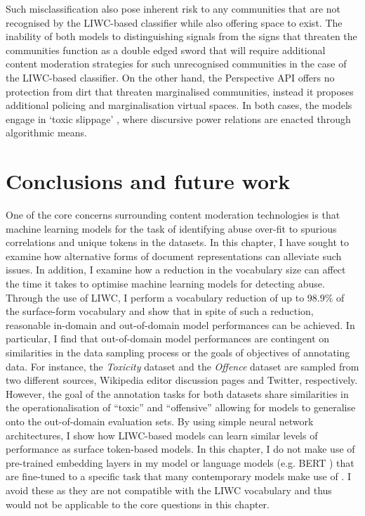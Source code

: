 Such misclassification also pose inherent risk to any communities that are not recognised by the LIWC-based classifier while also offering space to exist.
The inability of both models to distinguishing signals from the signs that threaten the communities function as a double edged sword that will require additional content moderation strategies for such unrecognised communities in the case of the LIWC-based classifier.
On the other hand, the Perspective API offers no protection from dirt that threaten marginalised communities, instead it proposes additional policing and marginalisation virtual spaces.
In both cases, the models engage in `toxic slippage' \citep{Risam:2015}, where discursive power relations are enacted through algorithmic means.

\section{Conclusions and future work}

One of the core concerns surrounding content moderation technologies is that machine learning models for the task of identifying abuse over-fit to spurious correlations and unique tokens in the datasets.
In this chapter, I have sought to examine how alternative forms of document representations can alleviate such issues.
In addition, I examine how a reduction in the vocabulary size can affect the time it takes to optimise machine learning models for detecting abuse.
Through the use of LIWC, I perform a vocabulary reduction of up to $98.9\%$ of the surface-form vocabulary and show that in spite of such a reduction, reasonable in-domain and out-of-domain model performances can be achieved.
In particular, I find that out-of-domain model performances are contingent on similarities in the data sampling process or the goals of objectives of annotating data.
For instance, the \textit{Toxicity} dataset and the \textit{Offence} dataset are sampled from two different sources, Wikipedia editor discussion pages and Twitter, respectively.
However, the goal of the annotation tasks for both datasets share similarities in the operationalisation of ``toxic'' and ``offensive'' allowing for models to generalise onto the out-of-domain evaluation sets.
By using simple neural network architectures, I show how LIWC-based models can learn similar levels of performance as surface token-based models.
In this chapter, I do not make use of pre-trained embedding layers \citep{Park:2017,Kolhatkar:2020} in my model or language models (e.g. BERT \citep{Devlin:2019}) that are fine-tuned to a specific task that many contemporary models make use of \citep{Vidgen_learning:2020,Isaksen:2020}.
I avoid these as they are not compatible with the LIWC vocabulary and thus would not be applicable to the core questions in this chapter.

